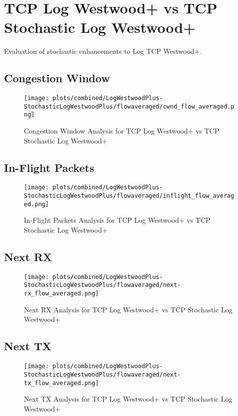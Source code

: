 \documentclass[12pt,a4paper]{report}
\begin{document}
\newpage

\section{TCP Log Westwood+ vs TCP Stochastic Log Westwood+}
\noindent Evaluation of stochastic enhancements to Log TCP Westwood+.


\newpage
\subsection{Congestion Window}
\begin{figure}[H]
\centering
\texttt{[image: plots/combined/LogWestwoodPlus-StochasticLogWestwoodPlus/flowaveraged/cwnd\_flow\_averaged.png]}
\caption{Congestion Window Analysis for TCP Log Westwood+ vs TCP Stochastic Log Westwood+}
\label{fig:LogWestwoodPlus-StochasticLogWestwoodPlus_cwnd}
\end{figure}

\newpage

\newpage
\subsection{In-Flight Packets}
\begin{figure}[H]
\centering
\texttt{[image: plots/combined/LogWestwoodPlus-StochasticLogWestwoodPlus/flowaveraged/inflight\_flow\_averaged.png]}
\caption{In-Flight Packets Analysis for TCP Log Westwood+ vs TCP Stochastic Log Westwood+}
\label{fig:LogWestwoodPlus-StochasticLogWestwoodPlus_inflight}
\end{figure}

\newpage

\newpage
\subsection{Next RX}
\begin{figure}[H]
\centering
\texttt{[image: plots/combined/LogWestwoodPlus-StochasticLogWestwoodPlus/flowaveraged/next-rx\_flow\_averaged.png]}
\caption{Next RX Analysis for TCP Log Westwood+ vs TCP Stochastic Log Westwood+}
\label{fig:LogWestwoodPlus-StochasticLogWestwoodPlus_next-rx}
\end{figure}

\newpage

\newpage
\subsection{Next TX}
\begin{figure}[H]
\centering
\texttt{[image: plots/combined/LogWestwoodPlus-StochasticLogWestwoodPlus/flowaveraged/next-tx\_flow\_averaged.png]}
\caption{Next TX Analysis for TCP Log Westwood+ vs TCP Stochastic Log Westwood+}
\label{fig:LogWestwoodPlus-StochasticLogWestwoodPlus_next-tx}
\end{figure}
\end{document}
